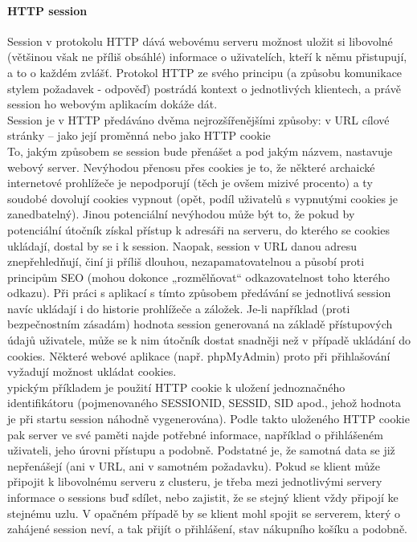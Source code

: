 \documentclass[10pt,a4paper]{article}
\begin{document}
\paragraph{HTTP session} Session v protokolu HTTP dává webovému serveru možnost uložit si libovolné (většinou však ne příliš obsáhlé) informace o uživatelích, kteří k němu přistupují, a to o každém zvlášť. Protokol HTTP ze svého principu (a způsobu komunikace stylem požadavek - odpověď) postrádá kontext o jednotlivých klientech, a právě session ho webovým aplikacím dokáže dát. \\
Session je v HTTP předáváno dvěma nejrozšířenějšími způsoby: v URL cílové stránky – jako její proměnná nebo jako HTTP cookie \\
To, jakým způsobem se session bude přenášet a pod jakým názvem, nastavuje webový server. Nevýhodou přenosu přes cookies je to, že některé archaické internetové prohlížeče je nepodporují (těch je ovšem mizivé procento) a ty soudobé dovolují cookies vypnout (opět, podíl uživatelů s vypnutými cookies je zanedbatelný). Jinou potenciální nevýhodou může být to, že pokud by potenciální útočník získal přístup k adresáři na serveru, do kterého se cookies ukládají, dostal by se i k session. Naopak, session v URL danou adresu znepřehledňují, činí ji příliš dlouhou, nezapamatovatelnou a působí proti principům SEO (mohou dokonce „rozmělňovat“ odkazovatelnost toho kterého odkazu). Při práci s aplikací s tímto způsobem předávání se jednotlivá session navíc ukládají i do historie prohlížeče a záložek. Je-li například (proti bezpečnostním zásadám) hodnota session generovaná na základě přístupových údajů uživatele, může se k nim útočník dostat snadněji než v případě ukládání do cookies. Některé webové aplikace (např. phpMyAdmin) proto při přihlašování vyžadují možnost ukládat cookies. \\
ypickým příkladem je použití HTTP cookie k uložení jednoznačného identifikátoru (pojmenovaného SESSIONID, SESSID, SID apod., jehož hodnota je při startu session náhodně vygenerována). Podle takto uloženého HTTP cookie pak server ve své paměti najde potřebné informace, například o přihlášeném uživateli, jeho úrovni přístupu a podobně. Podstatné je, že samotná data se již nepřenášejí (ani v URL, ani v samotném požadavku). Pokud se klient může připojit k libovolnému serveru z clusteru, je třeba mezi jednotlivými servery informace o sessions buď sdílet, nebo zajistit, že se stejný klient vždy připojí ke stejnému uzlu. V opačném případě by se klient mohl spojit se serverem, který o zahájené session neví, a tak přijít o přihlášení, stav nákupního košíku a podobně. \\
\end{document}

